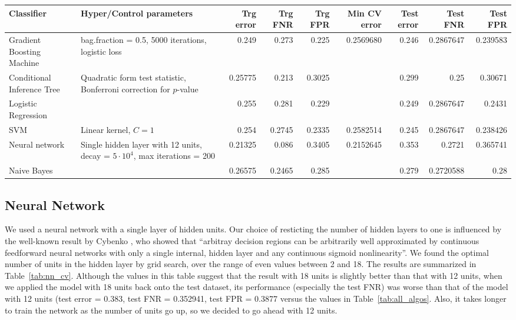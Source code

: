 \begin{table*}[!h]
\centering
\caption{Summary of performance of all classifiers}
\begin{tabular}{p{2cm}p{3cm}rrrrrrr}
\hline
Classifier & Hyper/Control parameters & Trg error & Trg FNR & Trg FPR & Min CV error & Test error & Test FNR & Test FPR\\
\hline
Gradient Boosting Machine & bag.fraction = 0.5, 5000 iterations, logistic loss & 0.249 & 0.273 & 0.225 & 0.2569680 & 0.246 & 0.2867647 & 0.239583\\
Conditional Inference Tree & Quadratic form test statistic, Bonferroni correction for $p$-value & 0.25775 & 0.213 & 0.3025 & & 0.299 & 0.25 & 0.30671\\
Logistic Regression & & 0.255 & 0.281 & 0.229 & & 0.249 & 0.2867647 & 0.2431\\
SVM & Linear kernel, $C = 1$ & 0.254 & 0.2745 & 0.2335 & 0.2582514 & 0.245 & 0.2867647 & 0.238426\\
Neural network & Single hidden layer with 12 units, decay = $5{\cdot}10^4$, max iterations = 200 & 0.21325 & 0.086 & 0.3405 & 0.2152645 & 0.353 & 0.2721 & 0.365741\\
Naive Bayes & & 0.26575 & 0.2465 & 0.285 & & 0.279 & 0.2720588 & 0.28\\
\hline
\end{tabular}
\label{tab:all_algos}
\end{table*}


\subsection{Neural Network}
\label{subsec:nnet}
We used a neural network with a single layer of hidden units. Our choice of resticting the number of hidden layers to one is influenced by the well-known result by Cybenko \cite{Cybenko92}, who showed that ``arbitray decision regions can be arbitrarily well approximated by continuous feedforward neural networks with only a single internal, hidden layer and any continuous sigmoid nonlinearity''. We found the optimal number of units in the hidden layer by grid search, over the range of even values between 2 and 18. The results are summarized in Table~\ref{tab:nn_cv}. Although the values in this table suggest that the result with 18 units is slightly better than that with 12 units, when we applied the model with 18 units back onto the test dataset, its performance (especially the test FNR) was worse than that of the model with 12 units (test error = 0.383, test FNR = 0.352941, test FPR = 0.3877 versus the values in Table~\ref{tab:all_algos}. Also, it takes longer to train the network as the number of units go up, so we decided to go ahead with 12 units.

